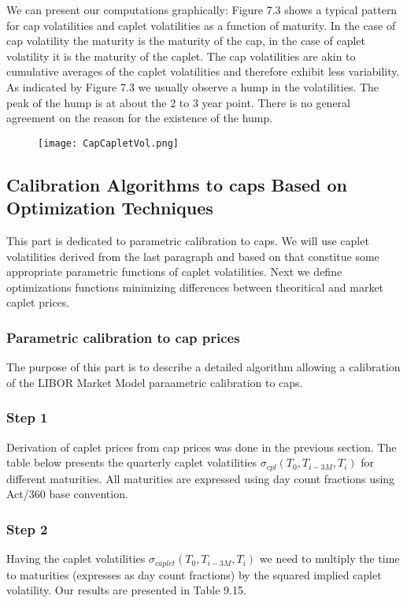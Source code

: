 \documentclass[11pt]{article}
\numberwithin{equation}{subsection}
\begin{document}
We can present our computations graphically:
Figure 7.3 shows a typical pattern for cap volatilities and caplet volatilities as a function
of maturity. In the case of cap volatility the maturity is the maturity of the cap, in the case
of caplet volatility it is the maturity of the caplet. The cap volatilities are akin to cumulative
averages of the caplet volatilities and therefore exhibit less variability. As indicated by
Figure 7.3 we usually observe a hump in the volatilities. The peak of the hump is at about
the 2 to 3 year point. There is no general agreement on the reason for the existence of
the hump.

\begin{figure}[H]
	\texttt{[image: CapCapletVol.png]}
\end{figure}


\subsection{Calibration Algorithms to caps Based on Optimization Techniques}
This part is dedicated to parametric calibration to caps. We will use caplet volatilities derived from the last paragraph and based on that constitue some appropriate parametric functions of caplet volatilities. Next we define optimizations functions minimizing differences between theoritical and market caplet prices.


\subsubsection{Parametric calibration to cap prices}
The purpose of this part is to describe a detailed algorithm allowing a calibration of the LIBOR Market Model paraametric calibration to caps.

\subsubsection*{Step 1}
Derivation of caplet prices from cap prices was done in the previous section.
The table below presents the quarterly caplet volatilities \(\sigma_{cpl}(T_{0}, T_{i-3M}, T_{i})\) for
different maturities. All maturities are expressed using day count fractions using Act/360
base convention.

\subsubsection*{Step 2}
Having the caplet volatilities \(\sigma_{caplet}(T_{0}, T_{i-3M}, T_{i})\) we need to multiply the time to maturities
(expresses as day count fractions) by the squared implied caplet volatility. Our results are
presented in Table 9.15.
\end{document}
